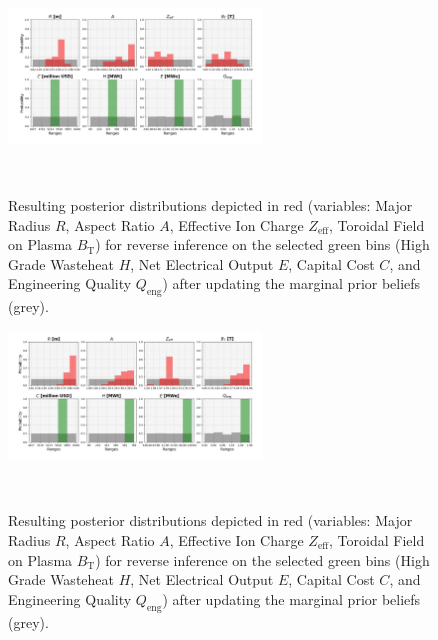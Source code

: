\begin{figure}[ht]
    \centering
    \includegraphics[width=0.6\textwidth]{figures/TE_results/march_data/config(57)_outputs(4)8.png}
    \caption{Resulting posterior distributions depicted in red (variables: Major Radius $R$, Aspect Ratio $A$, Effective Ion Charge $Z_{\text{eff}}$, Toroidal Field on Plasma $B_{\text{T}}$) for reverse
    inference on the selected green bins (High Grade Wasteheat $H$, Net Electrical Output $E$, Capital Cost $C$, and Engineering Quality $Q_{\text{eng}}$) after updating the marginal prior beliefs (grey).}~\label{fig:config(57)_outputs(4)8}
\end{figure}

\begin{figure}[ht]
    \centering
    \includegraphics[width=0.6\textwidth]{figures/TE_results/march_data/config(57)_outputs(4)3.png}
    \caption{Resulting posterior distributions depicted in red (variables: Major Radius $R$, Aspect Ratio $A$, Effective Ion Charge $Z_{\text{eff}}$, Toroidal Field on Plasma $B_{\text{T}}$) for reverse
    inference on the selected green bins (High Grade Wasteheat $H$, Net Electrical Output $E$, Capital Cost $C$, and Engineering Quality $Q_{\text{eng}}$) after updating the marginal prior beliefs (grey).}~\label{fig:config(57)_outputs(4)3}
\end{figure}

